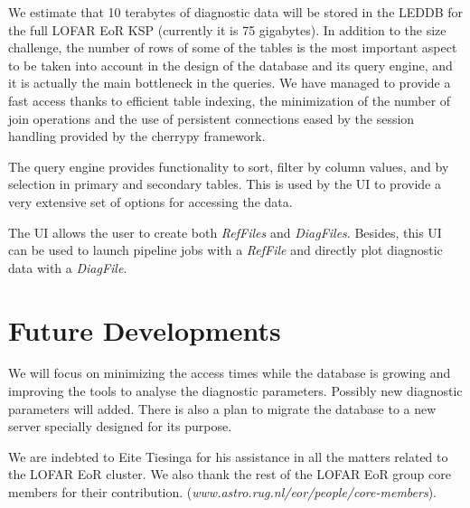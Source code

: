 We estimate that 10 terabytes of diagnostic data will be stored in the LEDDB for the full LOFAR EoR KSP (currently it is 75 gigabytes). In addition to the size challenge, the number of rows of some of the tables is the most important aspect to be taken into account in the design of the database and its query engine, and it is actually the main bottleneck in the queries. We have managed to provide a fast access thanks to efficient table indexing, the minimization of the number of join operations and the use of persistent connections eased by the session handling provided by the cherrypy framework. 

The query engine provides functionality to sort, filter by column values, and by selection in primary and secondary tables. This is used by the UI to provide a very extensive set of options for accessing the data.

The UI allows the user to create both \textit{RefFiles} and \textit{DiagFiles}. Besides, this UI can be used to launch pipeline jobs with a \textit{RefFile} and directly plot diagnostic data with a \textit{DiagFile}.

\section{Future Developments}
We will focus on minimizing the access times while the database is growing and improving the tools to analyse the diagnostic parameters. Possibly new diagnostic parameters will added. There is also a plan to migrate the database to a new server specially designed for its purpose. 

\acknowledgements We are indebted to Eite Tiesinga for his assistance in all the matters related to the LOFAR EoR cluster. We also thank the rest of the LOFAR EoR group core members for their contribution. (\textit{www.astro.rug.nl/eor/people/core-members}).
